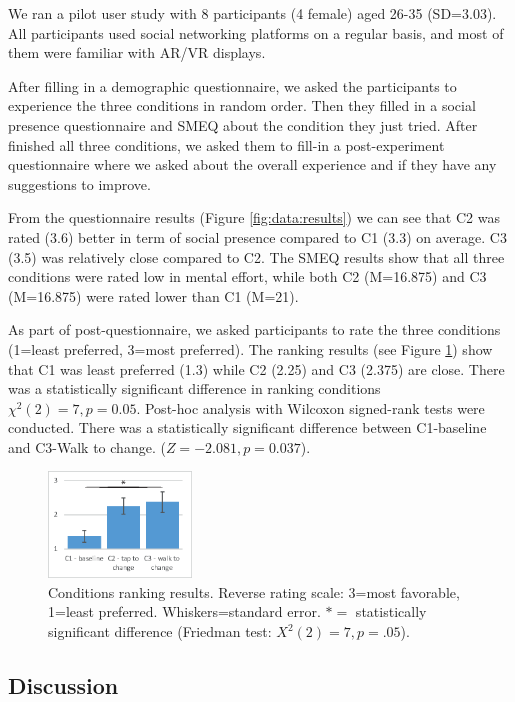 We ran a pilot user study with 8 participants (4 female) aged 26-35 (SD=3.03). All participants used social networking platforms on a regular basis, and most of them were familiar with AR/VR displays. 

After filling in a demographic questionnaire, we asked the participants to experience the three conditions in random order. Then they filled in a social presence questionnaire and SMEQ about the condition they just tried. After finished all three conditions, we asked them to fill-in a post-experiment questionnaire where we asked about the overall experience and if they have any suggestions to improve. 

From the questionnaire results (Figure \ref{fig:data:results}) we can see that C2 was rated (3.6) better in term of social presence compared to C1 (3.3) on average. C3 (3.5) was relatively close compared to C2. The SMEQ results show that all three conditions were rated low in mental effort, while both C2 (M=16.875) and C3 (M=16.875) were rated lower than C1 (M=21).

As part of post-questionnaire, we asked participants to rate the three conditions (1=least preferred, 3=most preferred). The ranking results (see Figure \ref{fig:data:ranking}) show that C1 was least preferred (1.3) while C2 (2.25) and C3 (2.375) are close. There was a statistically significant difference in ranking conditions $\chi^2(2)=7, p=0.05$. Post-hoc analysis with Wilcoxon signed-rank tests were conducted. There was a statistically significant difference between C1-baseline and C3-Walk to change. ($Z=-2.081, p=0.037$).

\begin{figure}[h]
  \centering
  \includegraphics[width=1.5in]{images/chi/images-05.eps}
  \caption{Conditions ranking results. Reverse rating scale: 3=most favorable, 1=least preferred. Whiskers=standard error. $*=$ statistically significant difference (Friedman test: $X^2(2)=7, p=.05$).}  
      \label{fig:data:ranking}
\end{figure}

\subsection{Discussion}

